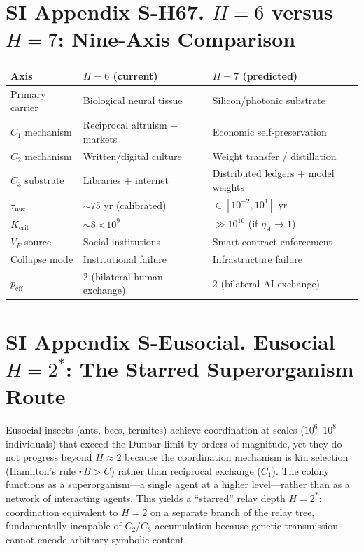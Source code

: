 \documentclass[11pt]{article}
\begin{document}
\section*{SI Appendix S-H67. $H{=}6$ versus $H{=}7$: Nine-Axis Comparison}

\begin{center}
\begin{tabular}{lll}
\toprule
Axis & $H=6$ (current) & $H=7$ (predicted) \\
\midrule
Primary carrier & Biological neural tissue & Silicon/photonic substrate \\
$C_1$ mechanism & Reciprocal altruism + markets & Economic self-preservation \\
$C_2$ mechanism & Written/digital culture & Weight transfer / distillation \\
$C_3$ substrate & Libraries + internet & Distributed ledgers + model weights \\
$\tau_{\mathrm{nuc}}$ & $\sim$75 yr (calibrated) & $\in [10^{-2}, 10^1]$ yr \\
$K_{\mathrm{crit}}$ & $\sim 8\times 10^9$ & $\gg 10^{10}$ (if $\eta_A \to 1$) \\
$V_F$ source & Social institutions & Smart-contract enforcement \\
Collapse mode & Institutional failure & Infrastructure failure \\
$p_{\mathrm{eff}}$ & 2 (bilateral human exchange) & 2 (bilateral AI exchange) \\
\bottomrule
\end{tabular}
\end{center}


\section*{SI Appendix S-Eusocial. Eusocial $H{=}2^*$: The Starred Superorganism Route}

Eusocial insects (ants, bees, termites) achieve coordination at scales ($10^6$--$10^8$ individuals) that exceed the Dunbar limit by orders of magnitude, yet they do not progress beyond $H\approx 2$ because the coordination mechanism is kin selection (Hamilton's rule $rB > C$) rather than reciprocal exchange ($C_1$).
The colony functions as a superorganism---a single agent at a higher level---rather than as a network of interacting agents.
This yields a ``starred'' relay depth $H{=}2^*$: coordination equivalent to $H=2$ on a separate branch of the relay tree, fundamentally incapable of $C_2$/$C_3$ accumulation because genetic transmission cannot encode arbitrary symbolic content.
\end{document}
